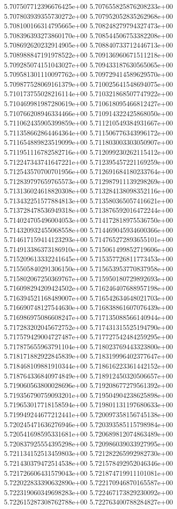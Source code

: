 5.707507712396676425e+00
5.707655825876208233e+00
5.707803939355730272e+00
5.707952052835262968e+00
5.708100166314795665e+00
5.708248279794327473e+00
5.708396393273860170e+00
5.708544506753382208e+00
5.708692620232914905e+00
5.708840733712446713e+00
5.708988847191978522e+00
5.709136960671511218e+00
5.709285074151043027e+00
5.709433187630565065e+00
5.709581301110097762e+00
5.709729414589629570e+00
5.709877528069161379e+00
5.710025641548694075e+00
5.710173755028216114e+00
5.710321868507747922e+00
5.710469981987280619e+00
5.710618095466812427e+00
5.710766208946334466e+00
5.710914322425868050e+00
5.711062435905399859e+00
5.711210549384931667e+00
5.711358662864464364e+00
5.711506776343996172e+00
5.711654889823519099e+00
5.711803003303050907e+00
5.711951116782582716e+00
5.712099230262115412e+00
5.712247343741647221e+00
5.712395457221169259e+00
5.712543570700701956e+00
5.712691684180233764e+00
5.712839797659765573e+00
5.712987911139298269e+00
5.713136024618820308e+00
5.713284138098352116e+00
5.713432251577884813e+00
5.713580365057416621e+00
5.713728478536949318e+00
5.713876592016472244e+00
5.714024705496004053e+00
5.714172818975536750e+00
5.714320932455068558e+00
5.714469045934600366e+00
5.714617159414123293e+00
5.714765272893655101e+00
5.714913386373186910e+00
5.715061499852719606e+00
5.715209613332241645e+00
5.715357726811773453e+00
5.715505840291306150e+00
5.715653953770837958e+00
5.715802067250369767e+00
5.715950180729892693e+00
5.716098294209424502e+00
5.716246407688957198e+00
5.716394521168489007e+00
5.716542634648021703e+00
5.716690748127544630e+00
5.716838861607076439e+00
5.716986975086608247e+00
5.717135088566140944e+00
5.717283202045672752e+00
5.717431315525194790e+00
5.717579429004727487e+00
5.717727542484259295e+00
5.717875655963791104e+00
5.718023769443323800e+00
5.718171882922845839e+00
5.718319996402377647e+00
5.718468109881910344e+00
5.718616223361442152e+00
5.718764336840974849e+00
5.718912450320506657e+00
5.719060563800028696e+00
5.719208677279561392e+00
5.719356790759093201e+00
5.719504904238625898e+00
5.719653017718158594e+00
5.719801131197680633e+00
5.719949244677212441e+00
5.720097358156745138e+00
5.720245471636276946e+00
5.720393585115798984e+00
5.720541698595331681e+00
5.720689812074863489e+00
5.720837925554395298e+00
5.720986039033927995e+00
5.721134152513459803e+00
5.721282265992982730e+00
5.721430379472514538e+00
5.721578492952046346e+00
5.721726606431579043e+00
5.721874719911101081e+00
5.722022833390632890e+00
5.722170946870165587e+00
5.722319060349698283e+00
5.722467173829230092e+00
5.722615287308762788e+00
5.722763400788284827e+00
